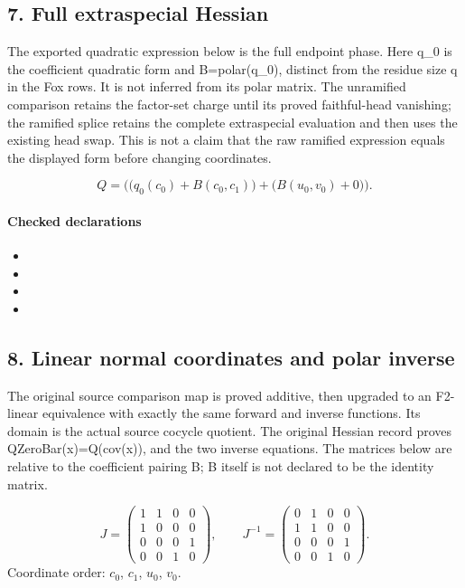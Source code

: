 \subsection*{7. Full extraspecial Hessian}
The exported quadratic expression below is the full endpoint phase. Here q\_0 is the coefficient quadratic form and B=polar(q\_0), distinct from the residue size q in the Fox rows. It is not inferred from its polar matrix. The unramified comparison retains the factor-set charge until its proved faithful-head vanishing; the ramified splice retains the complete extraspecial evaluation and then uses the existing head swap. This is not a claim that the raw ramified expression equals the displayed form before changing coordinates.

\[Q=\bigl(\bigl(q_0(c_0)+B(c_0,c_1)\bigr)+\bigl(B(u_{0},v_{0})+0\bigr)\bigr).\]
\paragraph{Checked declarations}
\begin{itemize}
\item {}
\item {}
\item {}
\item {}
\end{itemize}

\subsection*{8. Linear normal coordinates and polar inverse}
The original source comparison map is proved additive, then upgraded to an F2-linear equivalence with exactly the same forward and inverse functions. Its domain is the actual source cocycle quotient. The original Hessian record proves QZeroBar(x)=Q(cov(x)), and the two inverse equations. The matrices below are relative to the coefficient pairing B; B itself is not declared to be the identity matrix.

\[J=\begin{pmatrix}1&1&0&0\\1&0&0&0\\0&0&0&1\\0&0&1&0\end{pmatrix},\qquad J^{-1}=\begin{pmatrix}0&1&0&0\\1&1&0&0\\0&0&0&1\\0&0&1&0\end{pmatrix}.\]
Coordinate order: $c_0$, $c_1$, $u_{0}$, $v_{0}$.
